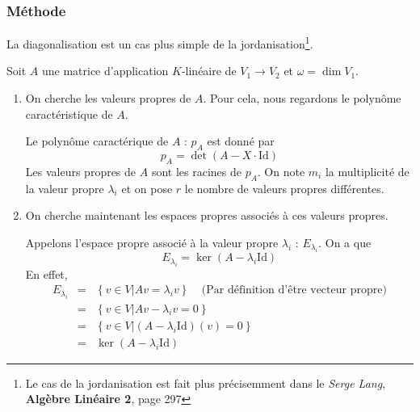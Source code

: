 \documentclass[a4paper,10pt]{article}
\newcommand{\ap}{ \rightarrow} %
\newcommand{\set}[1]{\left\lbrace #1 \right\rbrace } %
\newcommand{\id}{\mathrm{Id}} %
\begin{document}
   \subsubsection{Méthode}%
    La diagonalisation est un cas plus simple de la jordanisation\footnote{Le cas de la jordanisation est fait plus précisemment dans le \textit{Serge Lang}, \textbf{Algèbre Linéaire 2}, page 297}.
    
    Soit $A$ une matrice d'application $K$-linéaire de $V_1 \ap V_2$ et $\omega=\dim V_1$.

    \begin{enumerate}
     \item
      On cherche les valeurs propres de $A$. Pour cela, nous regardons le polynôme caractéristique de $A$.

      Le polynôme caractérique de $A$ : $p_A$ est donné par
       $$p_A=\det(A-X\cdot \id)$$
      Les valeurs propres de $A$ sont les racines de $p_A$. On note $m_i$ la multiplicité de la valeur propre $\lambda_i$ et on pose $r$ le nombre de valeurs propres différentes.
     \item
      On cherche maintenant les espaces propres associés à ces valeurs propres.

      Appelons l'espace propre associé à la valeur propre $\lambda_i$ : $E_{\lambda_i}$. On a que
       $$E_{\lambda_i}=\ker(A-\lambda_i \id)$$
      En effet,
      \begin{eqnarray*}
       E_{\lambda_i}&=&\set{v\in V | Av=\lambda_i v} ~~~~~\text{(Par définition d'être vecteur propre)}\\
        &=&\set{v\in V | Av-\lambda_i v=0}\\
        &=&\set{v\in V | (A-\lambda_i \id)(v)=0}\\
        &=&\ker(A-\lambda_i \id)
      \end{eqnarray*}


\end{enumerate}
\end{document}
